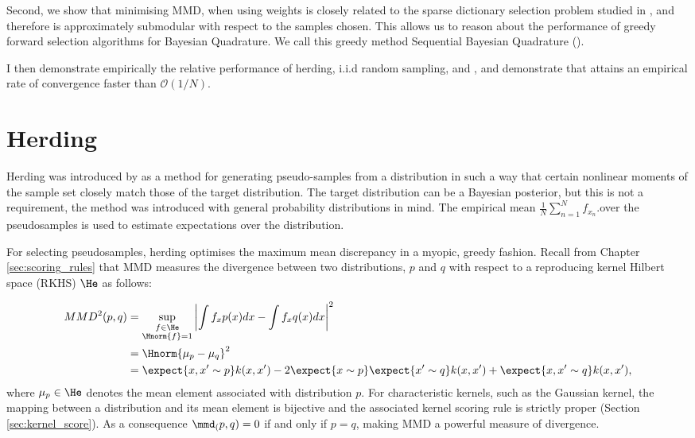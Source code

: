 Second, we show that minimising MMD, when using \bq{} weights is closely related to the sparse dictionary selection problem studied in \citep{KrauseCevher10}, and therefore is approximately submodular with respect to the samples chosen. This allows us to reason about the performance of greedy forward selection algorithms for Bayesian Quadrature. We call this greedy method Sequential Bayesian Quadrature (\sbq{}).

I then demonstrate empirically the relative performance of herding, i.i.d random sampling, and \sbq{}, and demonstrate that \sbq{} attains an empirical rate of convergence faster than $\mathcal{O}(1/N)$.


\section{Herding} 

Herding was introduced by \citep{welling2009herding} as a method for generating pseudo-samples from a distribution in such a way that certain nonlinear moments of the sample set closely match those of the target distribution. The target distribution can be a Bayesian posterior, but this is not a requirement, the method was introduced with general probability distributions in mind. The empirical mean  $\frac{1}{N}\sum_{n=1}^{N}f_{x_n}$.over the pseudosamples is used to estimate expectations over the distribution.

For selecting pseudosamples, herding optimises the maximum mean discrepancy \citep[MMD;\ ][]{Sriperumbudur2008} in a myopic, greedy fashion. Recall from Chapter \ref{sec:scoring_rules} that MMD measures the divergence between two distributions, $p$ and $q$ with respect to a reproducing kernel Hilbert space (RKHS) $\He$ as follows:

\begin{align}
MMD^2(p,q) &= \sup_{\substack{f\in\He\\\Hnorm{f}=1}}\left\vert\int f_x p(x) dx - \int f_x q(x) dx\right\vert^2\label{eqn:rkhs-mmd}\\
	&= \Hnorm{\mu_{p} - \mu_{q}}^2\\
	&=  \expect{x,x'\sim p} k(x,x')	- 2 \expect{x\sim p}\expect{x'\sim q} k(x,x') + \expect{x,x'\sim q} k(x,x'),
\end{align}
%
where $\mu_{p}\in\He$ denotes the mean element associated with distribution $p$. For characteristic kernels, such as the Gaussian kernel, the mapping between a distribution and its mean element is bijective and the associated kernel scoring rule is strictly proper (Section \ref{sec:kernel_score}). As a consequence $\mmd_(p,q)=0$ if and only if $p=q$, making MMD a powerful measure of divergence.

